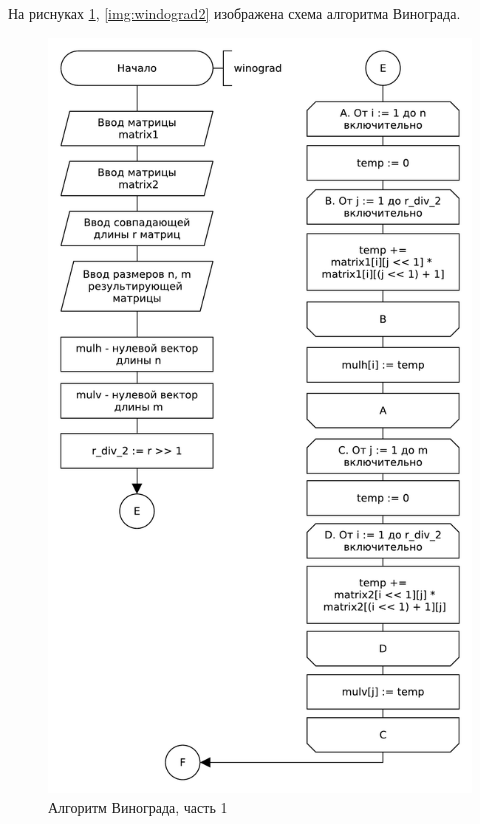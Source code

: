 На риснуках \ref{img:windograd1}, \ref{img:windograd2} изображена схема алгоритма Винограда.
\begin{figure}[H]
    \centering
    \includegraphics[scale=0.70]{pdf/owinograd-part1.pdf}
    \caption{Алгоритм Винограда, часть 1}
    \label{img:windograd1}
\end{figure}


